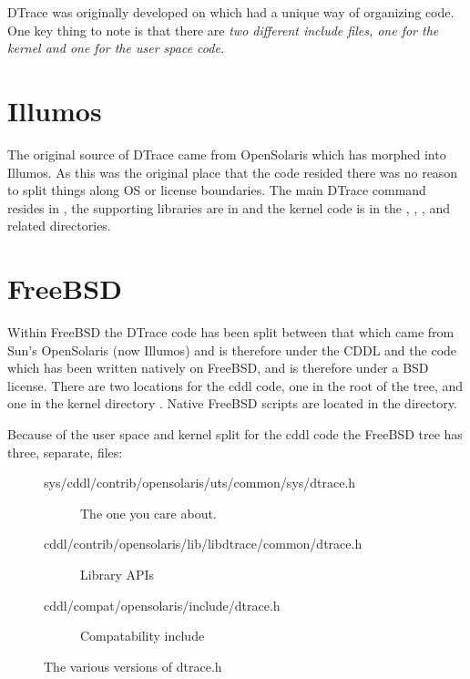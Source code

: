 DTrace was originally developed on  which had a
unique way of organizing code.  One key thing to note is that there
are \em{two different}  include files, one for the
kernel and one for the user space code.

\section{Illumos}
\label{sec:illumos-code}

The original source of DTrace came from OpenSolaris which has morphed
into Illumos.  As this was the original place that the code resided
there was no reason to split things along OS or license boundaries.
The main DTrace command resides in , the supporting
libraries are in  and the kernel code is in
the , , ,
and related directories.

\section{FreeBSD}
\label{sec:freebsd-code}

Within FreeBSD the DTrace code has been split between that which came
from Sun's OpenSolaris (now Illumos) and is therefore under the CDDL
and the code which has been written natively on FreeBSD, and is
therefore under a BSD license.  There are two locations for the cddl
code, one in the root of the tree,  and one in the
kernel directory .  Native FreeBSD scripts are
located in the  directory.

Because of the user space and kernel split for the cddl code the
FreeBSD tree has three, separate,  files:

\begin{figure}
  \centering
\begin{description}
\item [sys/cddl/contrib/opensolaris/uts/common/sys/dtrace.h] The one
  you care about.
\item [cddl/contrib/opensolaris/lib/libdtrace/common/dtrace.h] Library APIs
\item [cddl/compat/opensolaris/include/dtrace.h] Compatability include
\end{description}
  \caption{The various versions of dtrace.h}
  \label{fig:freebsd-dtrace-h}
\end{figure}

